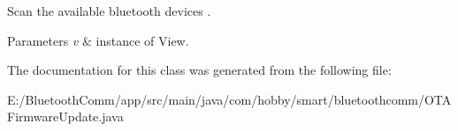 Scan the available bluetooth devices . 
\begin{DoxyParams}{Parameters}
{\em v} & instance of View. \\
\hline
\end{DoxyParams}


The documentation for this class was generated from the following file\+:\begin{DoxyCompactItemize}
\item 
E\+:/\+Bluetooth\+Comm/app/src/main/java/com/hobby/smart/bluetoothcomm/O\+T\+A\+Firmware\+Update.\+java\end{DoxyCompactItemize}
